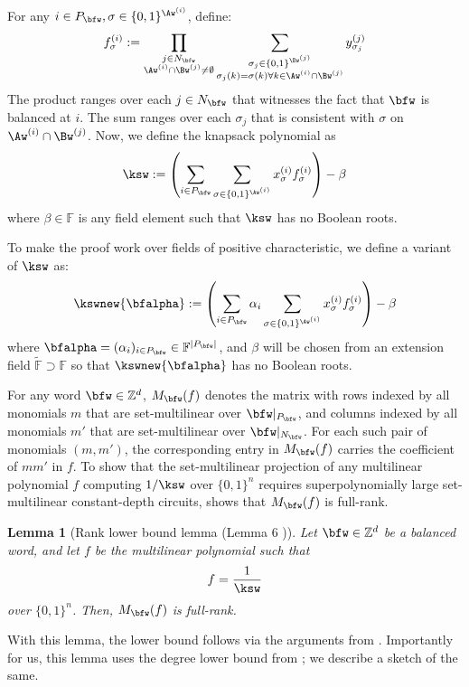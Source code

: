 \documentclass[11pt]{article}
\newtheorem{lemma}[theorem]{Lemma}
\newcommand{\Boo}{\{0,1 \}}
\newcommand{\F}{\mathbb{F}}
\begin{document}
For any $i\in P_\bfw, \sigma \in \Boo^{\Aw^{(i)}}$, define: 
\begin{equation}
    f_\sigma^{(i)} := \prod_{\substack{j \in N_\bfw \\ \Aw^{(i)} \cap \Bw^{(j)} \neq \emptyset}} \sum_{\substack{\sigma_j \in \Boo^{\Bw^{(j)}}\\ \sigma_j(k) = \sigma(k) \forall k \in  \Aw^{(i)} \cap \Bw^{(j)} }} y_{\sigma_j}^{(j)}
\end{equation}
The product ranges over each $j \in N_{\bfw}$ that witnesses the fact that $\bfw$ is balanced at $i$. The sum ranges over each $\sigma_j$ that is consistent with $\sigma$ on $\Aw^{(i)} \cap \Bw^{(j)}$. Now, we define the knapsack polynomial as
\begin{equation}
    \ksw := \left ( \sum_{i\in P_\bfw}\sum_{\sigma \in \Boo^{\Aw^{(i)}}} x_{\sigma}^{(i)}f_\sigma^{(i)} \right ) - \beta
\end{equation}
where $\beta \in \F$ is any field element such that $\ksw$ has no Boolean roots.

To make the proof work over fields of positive characteristic, we define a variant of $\ksw$ as:
\begin{equation}
    \kswnew{\bfalpha}:= \left ( \sum_{i\in P_\bfw}\alpha_i\sum_{\sigma \in \Boo^{\Aw^{(i)}}} x_{\sigma}^{(i)}f_\sigma^{(i)} \right ) - \beta
\end{equation}    
where $\bfalpha = (\alpha_i)_{i\in P_\bfw} \in \F^{|P_\bfw|}$, and $\beta$ will be chosen from an extension field $\tilde{\F} \supset \F$ so that $\kswnew{\bfalpha}$ has no Boolean roots. 

For any word $\bfw \in \mathbb{Z}^d$, $M_\bfw(f)$ denotes the matrix with rows indexed by all monomials $m$ that are set-multilinear over $\bfw|_{P_\bfw}$, and columns indexed by all monomials $m'$ that are set-multilinear over $\bfw|_{N_\bfw}$. For each such pair of monomials $(m,m')$, the corresponding entry in $M_\bfw(f)$ carries the coefficient of $mm'$ in $f$. To show that the set-multilinear projection of any multilinear polynomial $f$ computing $1/\ksw$ over $\Boo^n$ requires superpolynomially large set-multilinear constant-depth circuits, \cite{GHT} shows that $M_\bfw(f)$ is full-rank.
\begin{lemma}[Rank lower bound lemma (Lemma 6 \cite{GHT})]\label{lem: ght rank lower bound}
    Let $\bfw \in \mathbb{Z}^d$ be a balanced word, and let $f$ be the multilinear polynomial such that $$f = \frac{1}{\ksw}$$
    over $\Boo^n$. Then, $M_\bfw(f)$ is full-rank.
\end{lemma}
With this lemma, the lower bound follows via the arguments from \cite{LST}. Importantly for us, this lemma uses the degree lower bound from \cite{FSTW21}; we describe a sketch of the same. 
\end{document}

